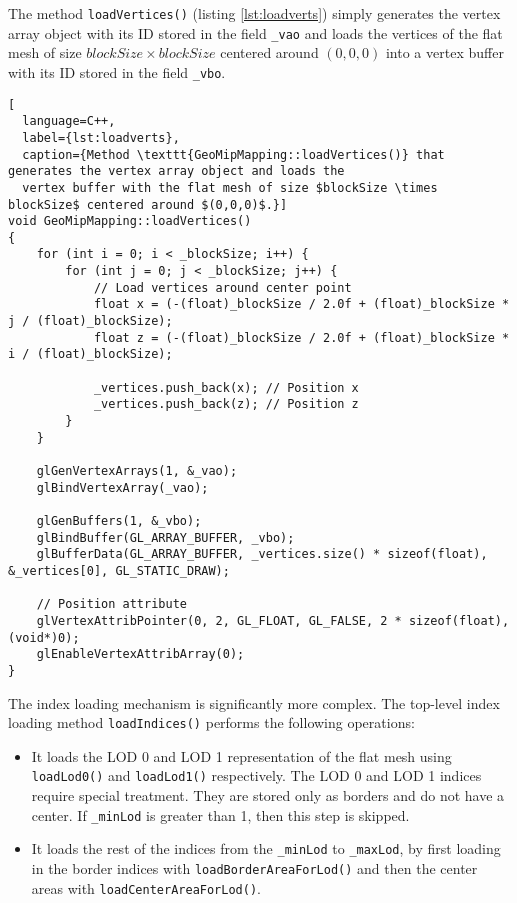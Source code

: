 The method \texttt{loadVertices()} (listing \ref{lst:loadverts}) simply generates the vertex array object with its ID stored in the field \texttt{\_vao}
and loads the vertices of the flat mesh of size $blockSize \times blockSize$
centered around $(0,0,0)$ into a vertex buffer with its ID stored in the field \texttt{\_vbo}.
\begin{lstlisting}[
  language=C++,
  label={lst:loadverts},
  caption={Method \texttt{GeoMipMapping::loadVertices()} that generates the vertex array object and loads the
  vertex buffer with the flat mesh of size $blockSize \times blockSize$ centered around $(0,0,0)$.}]
void GeoMipMapping::loadVertices()
{
    for (int i = 0; i < _blockSize; i++) {
        for (int j = 0; j < _blockSize; j++) {
            // Load vertices around center point 
            float x = (-(float)_blockSize / 2.0f + (float)_blockSize * j / (float)_blockSize);
            float z = (-(float)_blockSize / 2.0f + (float)_blockSize * i / (float)_blockSize);

            _vertices.push_back(x); // Position x 
            _vertices.push_back(z); // Position z 
        }
    }

    glGenVertexArrays(1, &_vao);
    glBindVertexArray(_vao);

    glGenBuffers(1, &_vbo);
    glBindBuffer(GL_ARRAY_BUFFER, _vbo);
    glBufferData(GL_ARRAY_BUFFER, _vertices.size() * sizeof(float), &_vertices[0], GL_STATIC_DRAW);

    // Position attribute
    glVertexAttribPointer(0, 2, GL_FLOAT, GL_FALSE, 2 * sizeof(float), (void*)0);
    glEnableVertexAttribArray(0);
}
\end{lstlisting}

The index loading mechanism is significantly more complex.
The top-level index loading method \texttt{loadIndices()}
performs the following operations:
\begin{itemize}
  \item It loads the LOD 0 and LOD 1 representation of the flat mesh using \texttt{loadLod0()} and \texttt{loadLod1()} respectively. The LOD 0 and LOD 1 indices require special treatment. They are stored only as borders and do not have a center.
        If \texttt{\_minLod} is greater than 1, then this step is skipped.
  \item It loads the rest of the indices from the \texttt{\_minLod} to \texttt{\_maxLod}, by first loading in the border indices with \texttt{loadBorderAreaForLod()}
        and then the center areas with \texttt{loadCenterAreaForLod()}.
\end{itemize}

